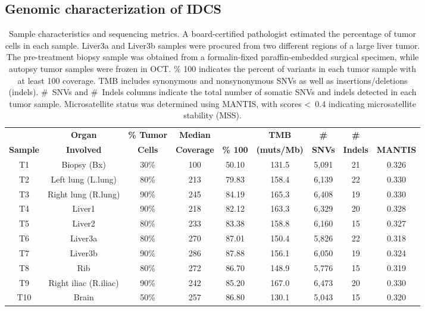 \subsection{Genomic characterization of IDCS}
\begin{table}[ht]
    \centering
    {\footnotesize
    \setlength{\tabcolsep}{2.9pt}
    \begin{tabular}{ccccccccc}
        & \textbf{Organ} & \textbf{\% Tumor} & \textbf{Median} & & \textbf{TMB} & \textbf{\#} & \textbf{\#} & \\
        \textbf{Sample} & \textbf{Involved} & \textbf{Cells} & \textbf{Coverage} & \textbf{\% 100\texttimes{}} & \textbf{(muts/Mb)} & \textbf{SNVs} & \textbf{Indels} & \textbf{MANTIS} \\
        \hline
        T1  & Biopsy (Bx) & 30\%  & 100   & 50.10  & 131.5 & 5,091 & 21    & 0.326 \\
        T2  & Left lung (L.lung) & 80\%  & 213   & 79.83 & 158.4 & 6,139 & 22    & 0.330 \\
        T3  & Right lung (R.lung) & 90\%  & 245   & 84.19 & 165.3 & 6,408 & 19    & 0.330 \\
        T4  & Liver1 & 90\%  & 218   & 82.12 & 163.3 & 6,329 & 20    & 0.328 \\
        T5  & Liver2 & 80\%  & 233   & 83.38 & 158.8 & 6,160 & 15    & 0.327 \\
        T6  & Liver3a & 80\%  & 270   & 87.01 & 150.4 & 5,826 & 22    & 0.318 \\
        T7  & Liver3b & 90\%  & 286   & 87.88 & 156.1 & 6,050 & 19    & 0.324 \\
        T8  & Rib   & 80\%  & 272   & 86.70  & 148.9 & 5,776 & 15    & 0.319 \\
        T9  & Right iliac (R.iliac) & 90\%  & 242   & 85.20  & 167.0   & 6,473 & 20    & 0.330 \\
        T10 & Brain & 50\%  & 257   & 86.80  & 130.1 & 5,043 & 15    & 0.320 \\
    \end{tabular}}
    \caption[Sample characteristics and sequencing metrics.]{Sample characteristics and sequencing metrics. A board-certified pathologist estimated the percentage of tumor cells in each sample. Liver3a and Liver3b samples were procured from two different regions of a large liver tumor. The pre-treatment biopsy sample was obtained from a formalin-fixed paraffin-embedded surgical specimen, while autopsy tumor samples were frozen in OCT\@. \% 100\texttimes{} indicates the percent of variants in each tumor sample with at least 100\texttimes{} coverage. TMB includes synonymous and nonsynonymous SNVs as well as insertions/deletions (indels). \#~SNVs and \#~Indels columns indicate the total number of somatic SNVs and indels detected in each tumor sample. Microsatellite status was determined using MANTIS, with scores \textless{}~0.4 indicating microsatellite stability (MSS).}
    \label{table:303:wes_samples}
\end{table}
